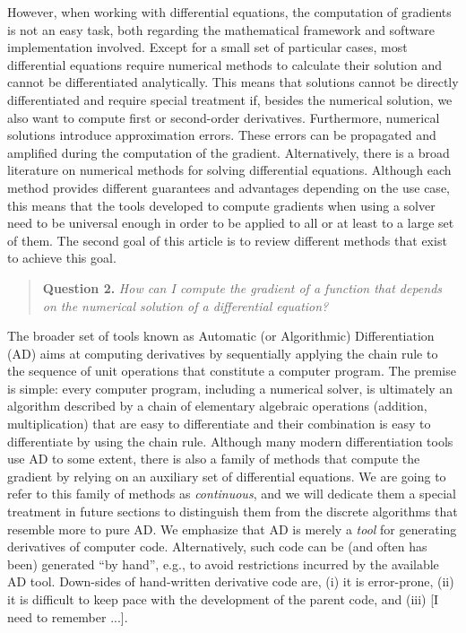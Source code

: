 However, when working with differential equations, the computation of gradients is not an easy task, both regarding the mathematical framework and software implementation involved. 
Except for a small set of particular cases, most differential equations require numerical methods to calculate their solution and cannot be differentiated analytically. 
This means that solutions cannot be directly differentiated and require special treatment if, besides the numerical solution, we also want to compute first or second-order derivatives. 
Furthermore, numerical solutions introduce approximation errors. 
These errors can be propagated and amplified during the computation of the gradient. 
Alternatively, there is a broad literature on numerical methods for solving differential equations. 
Although each method provides different guarantees and advantages depending on the use case, this means that the tools developed to compute gradients when using a solver need to be universal enough in order to be applied to all or 
at least to a large set of them. 
The second goal of this article is to review different methods that exist to achieve this goal.
\begin{quote}
    \textbf{Question 2. }
    \textit{How can I compute the gradient of a function that depends on the numerical solution of a differential equation?}
\end{quote}

The broader set of tools known as Automatic (or Algorithmic) Differentiation (AD) aims at computing derivatives by sequentially applying the chain rule to the sequence of unit operations that constitute a computer program\cite{Griewank:2008kh, Naumann.2011}. 
The premise is simple: every computer program, including a numerical solver, is ultimately an algorithm described by a chain of elementary algebraic operations (addition, multiplication) that are easy to differentiate and their combination is easy to differentiate by using the chain rule\cite{Giering:1998in}. 
Although many modern differentiation tools use AD to some extent, there is also a family of methods that compute the gradient by relying on an auxiliary set of differential equations. 
We are going to refer to this family of methods as \textit{continuous}, and we will dedicate them a special treatment in future sections to distinguish them from the discrete algorithms that resemble more to pure AD. 
We emphasize that AD is merely a \emph{tool} for generating derivatives of computer code. Alternatively, such code can be (and often has been) generated ``by hand'', e.g., to avoid restrictions incurred by the available AD tool.
Down-sides of hand-written derivative code are, (i) it is error-prone, (ii) it is difficult to keep pace with the development of the parent code, and (iii) [I need to remember ...].

